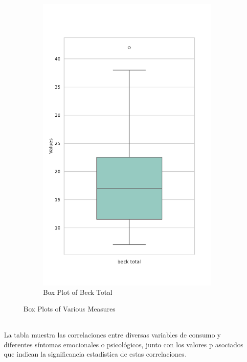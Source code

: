 \documentclass[jou]{apa7}
\begin{document}
\begin{figure}[H]
\begin{subfigure}[b]{0.45\linewidth}
		\includegraphics[width=\linewidth]{Box_Plot_of_beck_total.pdf}
		\caption{Box Plot of Beck Total}
		\label{fig:BoxPlotBeckTotal}
	\end{subfigure}
	
	\caption{Box Plots of Various Measures}
	\label{fig:BoxPlots}
\end{figure}

	
	\strut \\
	
	
	La tabla muestra las correlaciones entre diversas variables de consumo y
	diferentes síntomas emocionales o psicológicos, junto con los valores p
	asociados que indican la significancia estadística de estas
	correlaciones.
	
\end{document}
